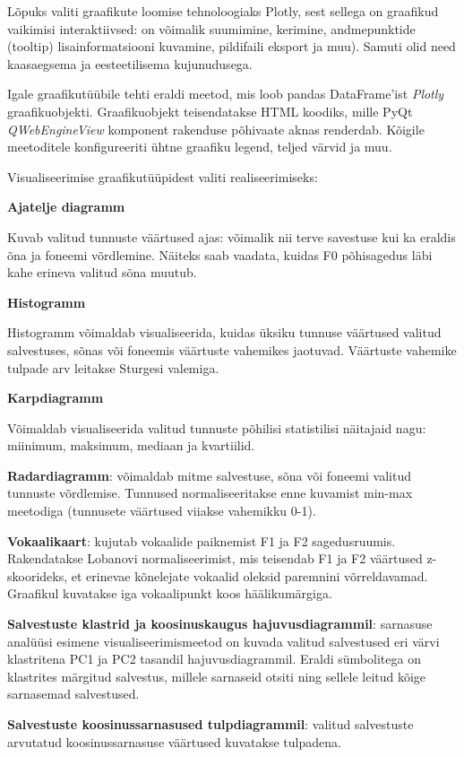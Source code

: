 Lõpuks valiti graafikute loomise tehnoloogiaks Plotly, sest sellega on graafikud vaikimisi interaktiivsed: on võimalik suumimine, kerimine, andmepunktide (tooltip) lisainformatsiooni kuvamine, pildifaili eksport ja muu). Samuti olid need kaasaegsema ja eesteetilisema kujunudusega.

Igale graafikutüübile tehti eraldi meetod, mis loob pandas DataFrame'ist \textit{Plotly} graafikuobjekti. Graafikuobjekt teisendatakse HTML koodiks, mille PyQt \textit{QWebEngineView} komponent rakenduse põhivaate aknas renderdab. Kõigile meetoditele konfigureeriti ühtne graafiku legend, teljed värvid ja muu.

Visualiseerimise graafikutüüpidest valiti realiseerimiseks:

\textbf{Ajatelje diagramm}

Kuvab valitud tunnuste väärtused ajas: võimalik nii terve savestuse kui ka eraldis õna ja foneemi võrdlemine. Näiteks saab vaadata, kuidas F0 põhisagedus läbi kahe erineva valitud sõna muutub.

\textbf{Histogramm}

Histogramm võimaldab visualiseerida, kuidas üksiku tunnuse väärtused valitud salvestuses, sõnas või foneemis väärtuste vahemikes jaotuvad. Väärtuste vahemike tulpade arv leitakse Sturgesi valemiga.

\textbf{Karpdiagramm}

Võimaldab visualiseerida valitud tunnuste põhilisi statistilisi näitajaid nagu: miinimum, maksimum, mediaan ja kvartiilid.

\textbf{Radardiagramm}: võimaldab mitme salvestuse, sõna või foneemi valitud tunnuste võrdlemise. Tunnused normaliseeritakse enne kuvamist min-max meetodiga (tunnusete väärtused viiakse vahemikku 0-1).

\textbf{Vokaalikaart}: kujutab vokaalide paiknemist F1 ja F2 sagedusruumis. Rakendatakse Lobanovi normaliseerimist, mis teisendab F1 ja F2 väärtused z-skoorideks, et erinevae kõnelejate vokaalid oleksid paremnini võrreldavamad. Graafikul kuvatakse iga vokaalipunkt koos häälikumärgiga.

\textbf{Salvestuste klastrid ja koosinuskaugus hajuvusdiagrammil}: sarnasuse analüüsi esimene visualiseerimismeetod on kuvada valitud salvestused eri värvi klastritena PC1 ja PC2 tasandil hajuvusdiagrammil. Eraldi sümbolitega on klastrites märgitud salvestus, millele sarnaseid otsiti ning sellele leitud kõige sarnasemad salvestused.

\textbf{Salvestuste koosinussarnasused tulpdiagrammil}: valitud salvestuste arvutatud koosinussarnasuse väärtused kuvatakse tulpadena.

